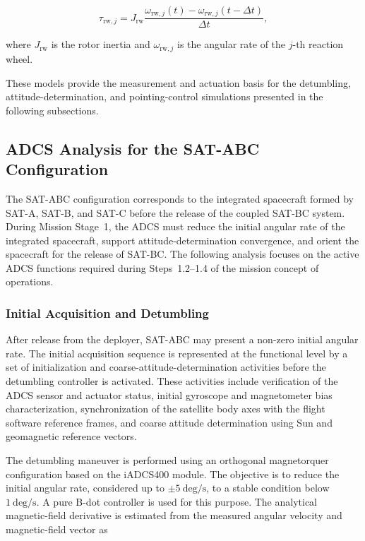 \begin{equation}
    \tau_{\mathrm{rw},j}
    =
    J_{\mathrm{rw}}
    \frac{
        \omega_{\mathrm{rw},j}(t)
        -
        \omega_{\mathrm{rw},j}(t-\Delta t)
    }{\Delta t},
    \label{eq:adcs_rw_torque}
\end{equation}

where \(J_{\mathrm{rw}}\) is the rotor inertia and \(\omega_{\mathrm{rw},j}\) is the angular rate of the \(j\)-th reaction wheel.

These models provide the measurement and actuation basis for the detumbling, attitude-determination, and pointing-control simulations presented in the following subsections.

\subsection{ADCS Analysis for the SAT-ABC Configuration}
\label{sub:adcs_satabc_analysis}

The SAT-ABC configuration corresponds to the integrated spacecraft formed by SAT-A, SAT-B, and SAT-C before the release of the coupled SAT-BC system. During Mission Stage~1, the ADCS must reduce the initial angular rate of the integrated spacecraft, support attitude-determination convergence, and orient the spacecraft for the release of SAT-BC. The following analysis focuses on the active ADCS functions required during Steps~1.2--1.4 of the mission concept of operations.

\subsubsection{Initial Acquisition and Detumbling}
\label{subsub:adcs_satabc_detumbling}

After release from the deployer, SAT-ABC may present a non-zero initial angular rate. The initial acquisition sequence is represented at the functional level by a set of initialization and coarse-attitude-determination activities before the detumbling controller is activated. These activities include verification of the ADCS sensor and actuator status, initial gyroscope and magnetometer bias characterization, synchronization of the satellite body axes with the flight software reference frames, and coarse attitude determination using Sun and geomagnetic reference vectors.

The detumbling maneuver is performed using an orthogonal magnetorquer configuration based on the iADCS400 module. The objective is to reduce the initial angular rate, considered up to \(\pm 5~\mathrm{deg/s}\), to a stable condition below \(1~\mathrm{deg/s}\). A pure B-dot controller is used for this purpose. The analytical magnetic-field derivative is estimated from the measured angular velocity and magnetic-field vector as

